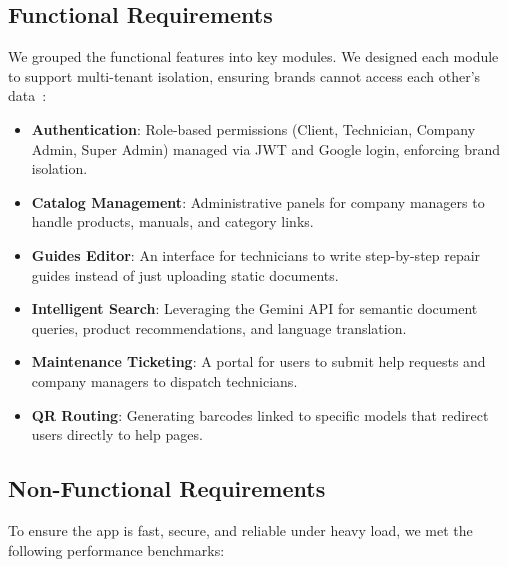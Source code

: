 \documentclass[12pt,a4paper]{report}
\begin{document}
\subsection{Functional Requirements}

We grouped the functional features into key modules. We designed each module to support multi-tenant isolation, ensuring brands cannot access each other's data~\cite{mongodb_multitenant}:

\begin{itemize}
    \item \textbf{Authentication}: Role-based permissions (Client, Technician, Company Admin, Super Admin) managed via JWT and Google login, enforcing brand isolation.
    \item \textbf{Catalog Management}: Administrative panels for company managers to handle products, manuals, and category links.
    \item \textbf{Guides Editor}: An interface for technicians to write step-by-step repair guides instead of just uploading static documents.
    \item \textbf{Intelligent Search}: Leveraging the Gemini API \cite{gemini} for semantic document queries, product recommendations, and language translation.
    \item \textbf{Maintenance Ticketing}: A portal for users to submit help requests and company managers to dispatch technicians.
    \item \textbf{QR Routing}: Generating barcodes linked to specific models that redirect users directly to help pages.
\end{itemize}

\subsection{Non-Functional Requirements}

To ensure the app is fast, secure, and reliable under heavy load, we met the following performance benchmarks:
\end{document}
